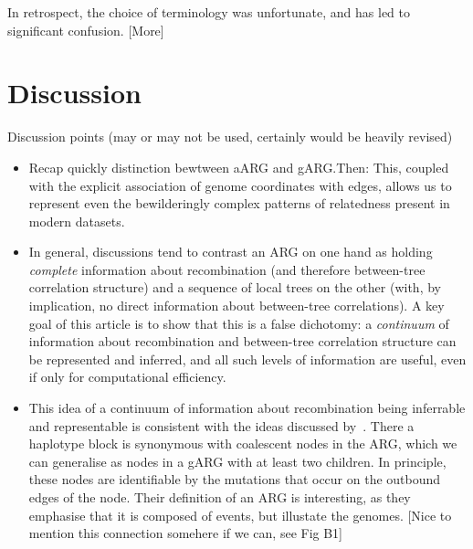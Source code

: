 \documentclass{article}
\begin{document}
In retrospect, the choice of terminology was unfortunate, and has led to
significant confusion. [More]



\section*{Discussion}

Discussion points (may or may not be used, certainly would be heavily revised)

\begin{itemize}

\item Recap quickly distinction bewtween aARG and gARG.Then:
    This, coupled with
    the explicit association of genome coordinates with edges, allows
    us to represent even the bewilderingly complex patterns of relatedness
    present in modern datasets.

\item In general, discussions tend to contrast an ARG
on one hand as holding \emph{complete} information about recombination
(and therefore between-tree correlation structure)
and a sequence of local trees on the other (with, by implication,
no direct information about between-tree correlations).
A key goal of this article is to show that this is a false dichotomy:
a \emph{continuum} of information about recombination and between-tree
correlation structure can be represented and inferred, and all
such levels of information are useful, even if only for computational
efficiency.

\item This idea of a continuum of information about recombination
being inferrable and representable is consistent with the ideas
discussed by~\cite{shipilina2022origin}. There a haplotype block
is synonymous with coalescent nodes in the ARG, which we can generalise
as nodes in a gARG with at least two children. In principle, these
nodes are identifiable by the mutations that occur on the outbound
edges of the node.
Their definition of an ARG is interesting, as they emphasise that it
is composed of events, but illustate the genomes. [Nice to mention
this connection somehere if we can, see Fig B1]


\end{itemize}
\end{document}
